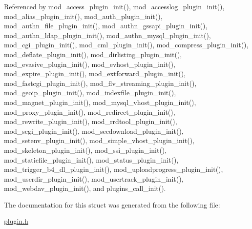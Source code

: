 Referenced by mod\-\_\-access\-\_\-plugin\-\_\-init(), mod\-\_\-accesslog\-\_\-plugin\-\_\-init(), mod\-\_\-alias\-\_\-plugin\-\_\-init(), mod\-\_\-auth\-\_\-plugin\-\_\-init(), mod\-\_\-authn\-\_\-file\-\_\-plugin\-\_\-init(), mod\-\_\-authn\-\_\-gssapi\-\_\-plugin\-\_\-init(), mod\-\_\-authn\-\_\-ldap\-\_\-plugin\-\_\-init(), mod\-\_\-authn\-\_\-mysql\-\_\-plugin\-\_\-init(), mod\-\_\-cgi\-\_\-plugin\-\_\-init(), mod\-\_\-cml\-\_\-plugin\-\_\-init(), mod\-\_\-compress\-\_\-plugin\-\_\-init(), mod\-\_\-deflate\-\_\-plugin\-\_\-init(), mod\-\_\-dirlisting\-\_\-plugin\-\_\-init(), mod\-\_\-evasive\-\_\-plugin\-\_\-init(), mod\-\_\-evhost\-\_\-plugin\-\_\-init(), mod\-\_\-expire\-\_\-plugin\-\_\-init(), mod\-\_\-extforward\-\_\-plugin\-\_\-init(), mod\-\_\-fastcgi\-\_\-plugin\-\_\-init(), mod\-\_\-flv\-\_\-streaming\-\_\-plugin\-\_\-init(), mod\-\_\-geoip\-\_\-plugin\-\_\-init(), mod\-\_\-indexfile\-\_\-plugin\-\_\-init(), mod\-\_\-magnet\-\_\-plugin\-\_\-init(), mod\-\_\-mysql\-\_\-vhost\-\_\-plugin\-\_\-init(), mod\-\_\-proxy\-\_\-plugin\-\_\-init(), mod\-\_\-redirect\-\_\-plugin\-\_\-init(), mod\-\_\-rewrite\-\_\-plugin\-\_\-init(), mod\-\_\-rrdtool\-\_\-plugin\-\_\-init(), mod\-\_\-scgi\-\_\-plugin\-\_\-init(), mod\-\_\-secdownload\-\_\-plugin\-\_\-init(), mod\-\_\-setenv\-\_\-plugin\-\_\-init(), mod\-\_\-simple\-\_\-vhost\-\_\-plugin\-\_\-init(), mod\-\_\-skeleton\-\_\-plugin\-\_\-init(), mod\-\_\-ssi\-\_\-plugin\-\_\-init(), mod\-\_\-staticfile\-\_\-plugin\-\_\-init(), mod\-\_\-status\-\_\-plugin\-\_\-init(), mod\-\_\-trigger\-\_\-b4\-\_\-dl\-\_\-plugin\-\_\-init(), mod\-\_\-uploadprogress\-\_\-plugin\-\_\-init(), mod\-\_\-userdir\-\_\-plugin\-\_\-init(), mod\-\_\-usertrack\-\_\-plugin\-\_\-init(), mod\-\_\-webdav\-\_\-plugin\-\_\-init(), and plugins\-\_\-call\-\_\-init().



The documentation for this struct was generated from the following file\-:\begin{DoxyCompactItemize}
\item 
\hyperlink{plugin_8h}{plugin.\-h}\end{DoxyCompactItemize}
